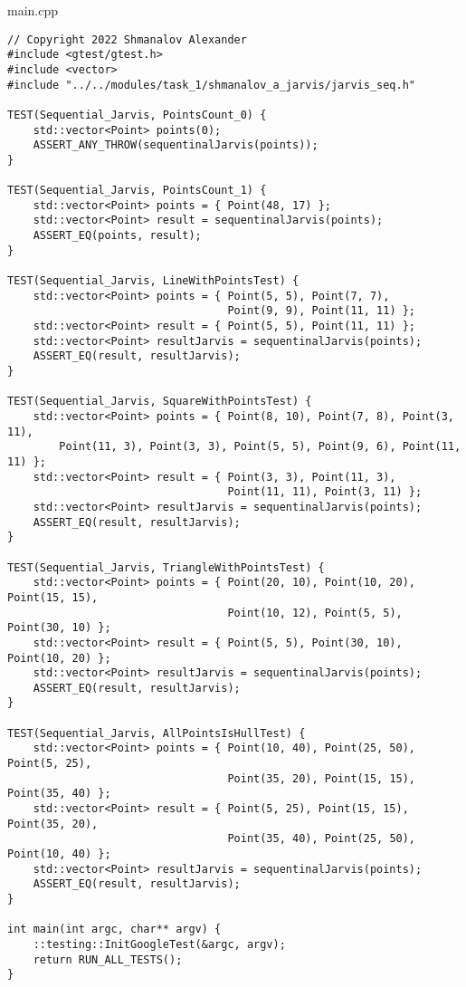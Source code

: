 \documentclass{report}
\begin{document}
\par main.cpp
\begin{lstlisting}
// Copyright 2022 Shmanalov Alexander
#include <gtest/gtest.h>
#include <vector>
#include "../../modules/task_1/shmanalov_a_jarvis/jarvis_seq.h"

TEST(Sequential_Jarvis, PointsCount_0) {
    std::vector<Point> points(0);
    ASSERT_ANY_THROW(sequentinalJarvis(points));
}

TEST(Sequential_Jarvis, PointsCount_1) {
    std::vector<Point> points = { Point(48, 17) };
    std::vector<Point> result = sequentinalJarvis(points);
    ASSERT_EQ(points, result);
}

TEST(Sequential_Jarvis, LineWithPointsTest) {
    std::vector<Point> points = { Point(5, 5), Point(7, 7),
                                  Point(9, 9), Point(11, 11) };
    std::vector<Point> result = { Point(5, 5), Point(11, 11) };
    std::vector<Point> resultJarvis = sequentinalJarvis(points);
    ASSERT_EQ(result, resultJarvis);
}

TEST(Sequential_Jarvis, SquareWithPointsTest) {
    std::vector<Point> points = { Point(8, 10), Point(7, 8), Point(3, 11),
        Point(11, 3), Point(3, 3), Point(5, 5), Point(9, 6), Point(11, 11) };
    std::vector<Point> result = { Point(3, 3), Point(11, 3),
                                  Point(11, 11), Point(3, 11) };
    std::vector<Point> resultJarvis = sequentinalJarvis(points);
    ASSERT_EQ(result, resultJarvis);
}

TEST(Sequential_Jarvis, TriangleWithPointsTest) {
    std::vector<Point> points = { Point(20, 10), Point(10, 20), Point(15, 15),
                                  Point(10, 12), Point(5, 5), Point(30, 10) };
    std::vector<Point> result = { Point(5, 5), Point(30, 10), Point(10, 20) };
    std::vector<Point> resultJarvis = sequentinalJarvis(points);
    ASSERT_EQ(result, resultJarvis);
}

TEST(Sequential_Jarvis, AllPointsIsHullTest) {
    std::vector<Point> points = { Point(10, 40), Point(25, 50), Point(5, 25),
                                  Point(35, 20), Point(15, 15), Point(35, 40) };
    std::vector<Point> result = { Point(5, 25), Point(15, 15), Point(35, 20),
                                  Point(35, 40), Point(25, 50), Point(10, 40) };
    std::vector<Point> resultJarvis = sequentinalJarvis(points);
    ASSERT_EQ(result, resultJarvis);
}

int main(int argc, char** argv) {
    ::testing::InitGoogleTest(&argc, argv);
    return RUN_ALL_TESTS();
}
\end{lstlisting}
\end{document}
